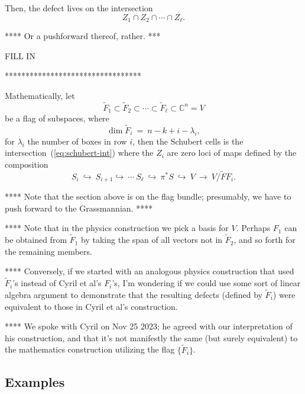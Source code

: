 \documentclass[12pt]{article}
\begin{document}
Then, the defect lives on the intersection
\begin{equation}     \label{eq:schubert-int}
Z_1 \cap Z_2 \cap \cdots \cap Z_{\ell}.
\end{equation}

**** Or a pushforward thereof, rather. ***



FILL IN

*********************************

Mathematically, let 
\begin{equation}
\tilde{F}_1 \subset \tilde{F}_2 \subset \cdots \subset \tilde{F}_{\ell} \subset
{\mathbb C}^n = V
\end{equation}
be a flag of subspaces, where
\begin{equation}
\dim \tilde{F}_i \: = \: n - k + i - \lambda_i,
\end{equation}
for $\lambda_i$ the number of boxes in row $i$,
then the Schubert cells is the intersection~(\ref{eq:schubert-int}) 
where the $Z_i$ are zero loci of maps defined by the composition
\begin{equation}
S_i \: \hookrightarrow \: S_{i+1} \hookrightarrow \: \cdots \:
S_{\ell} \: \hookrightarrow \: \pi^* S \: \hookrightarrow \:
V \: \longrightarrow \: V / \tilde{F}F_i.
\end{equation}

**** Note that the section above is on the flag bundle; presumably, we have
to push forward to the Grassmannian. ****

**** Note that in the physics construction we pick a basis for $V$.
Perhaps $F_1$ can be obtained from $\tilde{F}_1$ by taking the span of all
vectors not in $\tilde{F}_2$, and so forth for the remaining members.

**** Conversely, if we started with an analogous physics construction
that used $\tilde{F}_i$'s instead of Cyril et al's $F_i$'s, I'm wondering
if we could use some sort of linear algebra argument to demonstrate that
the resulting defects (defined by $\tilde{F}_i$) were equivalent to
those in Cyril et al's construction.

**** We spoke with Cyril on Nov 25 2023; he agreed with our interpretation
of his construction, and that it's not manifestly the same (but surely
equivalent) to the mathematics construction utilizing the flag
$\{ \tilde{F}_i \}$.


\subsection{Examples}
\end{document}
